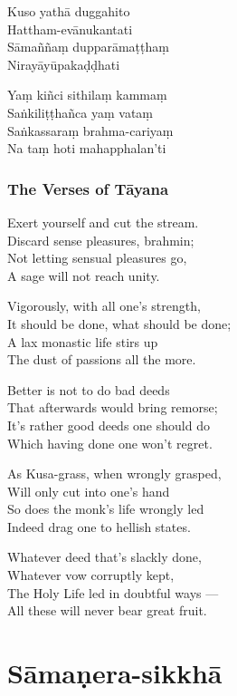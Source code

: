 Kuso yathā duggahito\\
Hattham-evānukantati\\
Sāmaññaṃ dupparāmaṭṭhaṃ\\
Nirayāyūpakaḍḍhati

Yaṃ kiñci sithilaṃ kammaṃ\\
Saṅkiliṭṭhañca yaṃ vataṃ\\
Saṅkassaraṃ brahma-cariyaṃ\\
Na taṃ hoti mahapphalan'ti


\subsubsection{The Verses of Tāyana}

Exert yourself and cut the stream.\\
Discard sense pleasures, brahmin;\\
Not letting sensual pleasures go,\\
A sage will not reach unity.

Vigorously, with all one's strength,\\
It should be done, what should be done;\\
A lax monastic life stirs up\\
The dust of passions all the more.

Better is not to do bad deeds\\
That afterwards would bring remorse;\\
It's rather good deeds one should do\\
Which having done one won't regret.

As Kusa-grass, when wrongly grasped,\\
Will only cut into one's hand\\
So does the monk's life wrongly led\\
Indeed drag one to hellish states.

Whatever deed that's slackly done,\\
Whatever vow corruptly kept,\\
The Holy Life led in doubtful ways ---\\
All these will never bear great fruit.

\section{Sāmaṇera-sikkhā}


